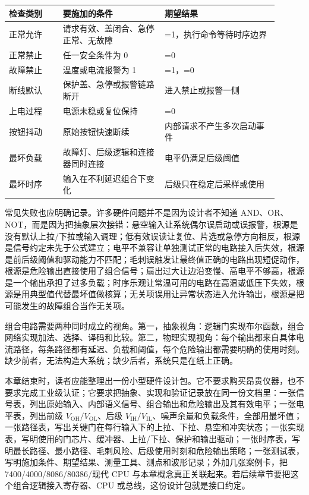 \begin{longtable}{L{0.18\linewidth}L{0.34\linewidth}L{0.38\linewidth}}
\toprule
检查类别 & 要施加的条件 & 期望结果 \\
\midrule
正常允许 & 请求有效、盖闭合、急停正常、无故障 & =1，执行命令等待时序边界 \\\tablerowrule
正常禁止 & 任一安全条件为 0 & =0 \\\tablerowrule
故障禁止 & 温度或电流报警为 1 & =1，=0 \\\tablerowrule
断线默认 & 保护盖、急停或报警链路断开 & 进入禁止或报警一侧 \\\tablerowrule
上电过程 & 电源未稳或复位保持 & =0 \\\tablerowrule
按钮抖动 & 原始按钮快速断续 & 内部请求不产生多次启动事件 \\\tablerowrule
最坏负载 & 故障灯、后级逻辑和连接器同时连接 & 电平仍满足后级阈值 \\\tablerowrule
最坏时序 & 输入在不利延迟组合下变化 & 后级只在稳定后采样或使用 \\
\bottomrule
\end{longtable}

常见失败也应明确记录。许多硬件问题并不是因为设计者不知道 AND、OR、NOT，而是因为把抽象层次接错：悬空输入让系统偶尔误启动或误报警，根源是没有默认上拉/下拉或输入调理；低有效误读让复位、片选或急停方向相反，根源是信号约定未先于公式建立；电平不兼容让单独测试正常的电路接入后失效，根源是前后级阈值和驱动能力不匹配；毛刺误触发让最终值正确的电路出现短促动作，根源是危险输出直接使用了组合信号；扇出过大让边沿变慢、高电平不够高，根源是一个输出承担了过多负载；时序乐观让常温可用的电路在高温或低压下失效，根源是用典型值代替最坏值做核算；无关项误用让异常状态进入允许输出，根源是把可能发生的故障组合当作无关项。

组合电路需要两种同时成立的视角。第一，抽象视角：逻辑门实现布尔函数，组合网络实现加法、选择、译码和比较。第二，物理实现视角：每个输出都来自具体电流路径，每条路径都有延迟、负载和阈值，每个危险输出都需要明确的使用时刻。缺少前者，无法构造大系统；缺少后者，系统只是在纸上正确。

本章结束时，读者应能整理出一份小型硬件设计包。它不要求购买昂贵仪器，也不要求完成工业级认证；它要求把抽象、实现和验证记录放在同一份文档里：一张信号表，列出原始输入、内部语义信号、组合输出和危险输出及其有效电平；一张电平表，列出前级 $V_\mathrm{OH}/V_\mathrm{OL}$、后级 $V_\mathrm{IH}/V_\mathrm{IL}$、噪声余量和负载条件，全部用最坏值；一张路径表，写出关键门在每行输入下的上拉、下拉、悬空和冲突状态；一张实现表，写明使用的门芯片、缓冲器、上拉/下拉、保护和输出驱动；一张时序表，写明最长路径、最小路径、毛刺风险、后级使用时刻和危险输出策略；一张测试表，写明施加条件、期望结果、测量工具、测点和波形记录；外加几张案例卡，把 7400/4000/8086/80386/现代 CPU 与本章概念真正关联起来。若后续章节要把这个组合逻辑接入寄存器、CPU 或总线，这份设计包就是接口约定。


